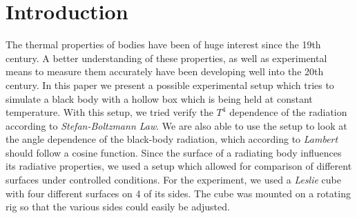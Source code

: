 \documentclass[a4paper,10pt,twocolumn]{article}
\begin{document}
    \section{Introduction}\label{sec:introdction}
    The thermal properties of bodies have been of huge interest since the 19th century.
    A better understanding of these properties, as well as experimental means to measure them accurately have been developing well into the 20th century.
    In this paper we present a possible experimental setup which tries to simulate a black body with a hollow box which is being held at constant temperature.
    With this setup, we tried verify the $T^4$ dependence of the radiation according to \textit{Stefan-Boltzmann Law}.
    We are also able to use the setup to look at the angle dependence of the black-body radiation, which according to \textit{Lambert} should follow a cosine function.
    Since the surface of a radiating body influences its radiative properties, we used a setup which allowed for comparison of different surfaces under controlled conditions.
    For the experiment, we used a \textit{Leslie} cube with four different surfaces on 4 of its sides.
    The cube was mounted on a rotating rig so that the various sides could easily be adjusted.
    
    
    
    
\end{document}
